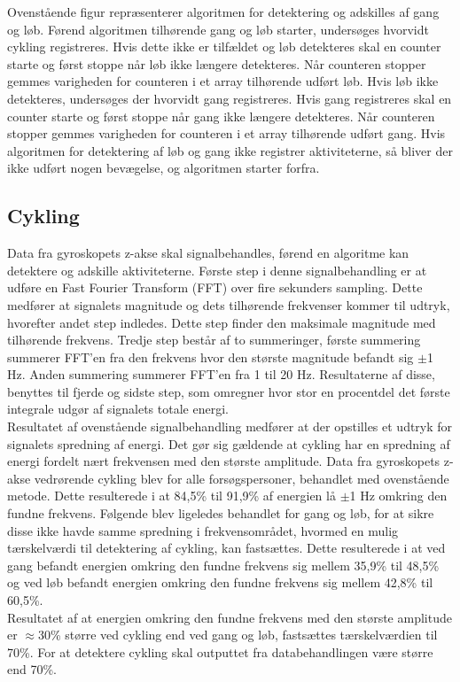 Ovenstående figur repræsenterer algoritmen for detektering og adskilles af gang og løb. Førend algoritmen tilhørende gang og løb starter, undersøges hvorvidt cykling registreres. Hvis dette ikke er tilfældet og løb detekteres skal en counter starte og først stoppe når løb ikke længere detekteres. Når counteren stopper gemmes varigheden for counteren i et array tilhørende udført løb. Hvis løb ikke detekteres, undersøges der hvorvidt gang registreres. Hvis gang registreres skal en counter starte og først stoppe når gang ikke længere detekteres. Når counteren stopper gemmes varigheden for counteren i et array tilhørende udført gang. Hvis algoritmen for detektering af løb og gang ikke registrer aktiviteterne, så bliver der ikke udført nogen bevægelse, og algoritmen starter forfra.


\subsection{Cykling}
Data fra gyroskopets z-akse skal signalbehandles, førend en algoritme kan detektere og adskille aktiviteterne. Første step i denne signalbehandling er at udføre en Fast Fourier Transform (FFT) over fire sekunders sampling. Dette medfører at signalets magnitude og dets tilhørende frekvenser kommer til udtryk, hvorefter andet step indledes. Dette step finder den maksimale magnitude med tilhørende frekvens. Tredje step består af to summeringer, første summering summerer FFT'en fra den frekvens hvor den største magnitude befandt sig $\pm$1 Hz. Anden summering summerer FFT'en fra 1 til 20 Hz. Resultaterne af disse, benyttes til fjerde og sidste step, som omregner hvor stor en procentdel det første integrale udgør af signalets totale energi. \\
Resultatet af ovenstående signalbehandling medfører at der opstilles et udtryk for signalets spredning af energi. Det gør sig gældende at cykling har en spredning af energi fordelt nært frekvensen med den største amplitude. Data fra gyroskopets z-akse vedrørende cykling blev for alle forsøgspersoner, behandlet med ovenstående metode. Dette resulterede i at 84,5\% til 91,9\% af energien lå $\pm$1 Hz omkring den fundne frekvens. Følgende blev ligeledes behandlet for gang og løb, for at sikre disse ikke havde samme spredning i frekvensområdet, hvormed en mulig tærskelværdi til detektering af cykling, kan fastsættes.  Dette resulterede i at ved gang befandt energien omkring den fundne frekvens sig mellem 35,9\% til 48,5\% og ved løb befandt energien omkring den fundne frekvens sig mellem 42,8\% til 60,5\%. \\
Resultatet af at energien omkring den fundne frekvens med den største amplitude er $\approx$30\% større ved cykling end ved gang og løb, fastsættes tærskelværdien til 70\%. For at detektere cykling skal outputtet fra databehandlingen være større end 70\%.

